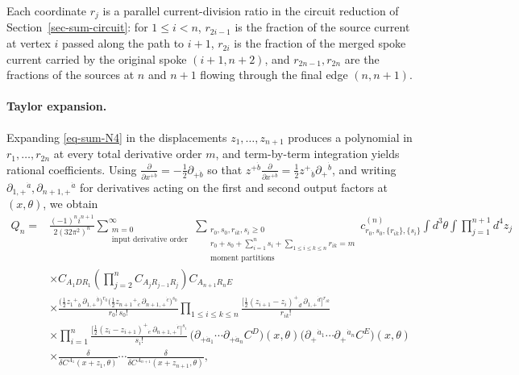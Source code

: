 \documentclass[11pt]{article}
\numberwithin{equation}{section}
\numberwithin{figure}{section}
\numberwithin{table}{section}
\begin{document}
Each coordinate $r_j$ is a parallel current-division ratio in the circuit reduction of Section~\ref{sec-sum-circuit}: for $1\le i<n$, $r_{2i-1}$ is the fraction of the source current at vertex $i$ passed along the path to $i+1$, $r_{2i}$ is the fraction of the merged spoke current carried by the original spoke $(i+1,n+2)$, and $r_{2n-1},r_{2n}$ are the fractions of the sources at $n$ and $n+1$ flowing through the final edge $(n,n+1)$.

\paragraph{Taylor expansion.}

Expanding \eqref{eq-sum-N4} in the displacements $z_1,\ldots,z_{n+1}$ produces a polynomial in $r_1,\ldots,r_{2n}$ at every total derivative order $m$, and term-by-term integration yields rational coefficients. Using $\tfrac{\partial}{\partial x^{+\dot b}}=-\tfrac12\partial_{+\dot b}$ so that $z^{+\dot b}\tfrac{\partial}{\partial x^{+\dot b}}=\tfrac12z^{+}{}_{\dot b}\partial_+{}^{\dot b}$, and writing $\partial_{1,+}{}^{\dot a},\partial_{n+1,+}{}^{\dot a}$ for derivatives acting on the first and second output factors at $(x,\theta)$, we obtain
\begin{equation}\label{eq-sum-N4-taylor}
\begin{aligned}
Q_n={}&\frac{(-1)^ni^{n+1}}{2(32\pi^2)^n}
\sum_{\substack{m=0\\\text{input derivative order}}}^{\infty}
\sum_{\substack{r_0,s_0,r_{ik},s_i\ge 0\\
r_0+s_0+\sum_{i=1}^n s_i+\sum_{1\le i\le k\le n}r_{ik}=m\\\text{moment partitions}}}
c^{(n)}_{r_0,s_0,\{r_{ik}\},\{s_i\}}
\int d^3\theta\int\prod_{j=1}^{n+1}d^4z_j\\
&\times C_{A_1DR_1}\left(\prod_{j=2}^nC_{A_jR_{j-1}R_j}\right)C_{A_{n+1}R_nE}\\
&\times\frac{\bigl(\tfrac12 z_1{}^{+}{}_{\dot b}\,\partial_{1,+}{}^{\dot b}\bigr)^{r_0}
\bigl(\tfrac12 z_{n+1}{}^{+}{}_{\dot c}\,\partial_{n+1,+}{}^{\dot c}\bigr)^{s_0}}{r_0!\,s_0!}
\prod_{1\le i\le k\le n}
\frac{\bigl[\tfrac12(z_{i+1}-z_i)^{+}{}_{\dot d}\,\partial_{1,+}{}^{\dot d}\bigr]^{r_{ik}}}{r_{ik}!}\\
&\times\prod_{i=1}^n
\frac{\bigl[\tfrac12(z_i-z_{i+1})^{+}{}_{\dot e}\,\partial_{n+1,+}{}^{\dot e}\bigr]^{s_i}}{s_i!}
\,\big(\partial_{+\dot a_1}\cdots\partial_{+\dot a_n}C^D\big)(x,\theta)
\big(\partial_+{}^{\dot a_1}\cdots\partial_+{}^{\dot a_n}C^E\big)(x,\theta)\\
&\times\frac{\delta}{\delta C^{A_1}(x+z_1,\theta)}\cdots
\frac{\delta}{\delta C^{A_{n+1}}(x+z_{n+1},\theta)},
\end{aligned}
\end{equation}
\end{document}
